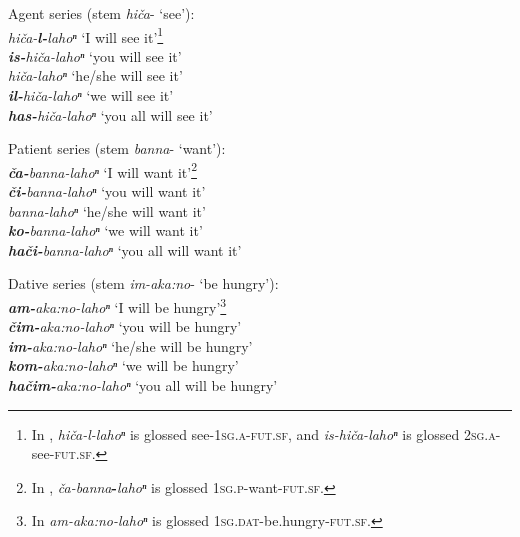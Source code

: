 \documentclass[output=paper,colorlinks,citecolor=brown]{langscibook}
\begin{document}
\ea\label{ex:koa:2} Agent series (stem \textit{hiča}- ‘see’): \\ 
        \textit{hiča-\textbf{l-}lahoⁿ} \tab ‘I will see it’\footnote{In , \textit{hiča-l-lahoⁿ} is glossed see-1\textsc{sg}.\textsc{a}{}-\textsc{fut}.\textsc{sf}, and \textit{is-hiča-lahoⁿ} is glossed 2\textsc{sg}.\textsc{a}-see-\textsc{fut}.\textsc{sf}.}  \\
        \textit{\textbf{is-}hiča-lahoⁿ} \tab ‘you will see it’ \\
        \textit{hiča-lahoⁿ} \tab ‘he/she will see it’ \\
        \textit{\textbf{il-}hiča-lahoⁿ} \tab ‘we will see it’ \\
        \textit{\textbf{has-}hiča-lahoⁿ} \tab ‘you all will see it’ \\
\z  

\ea\label{ex:koa:3} Patient series (stem \textit{banna}- ‘want’): \\
    \textit{\textbf{ča-}banna-lahoⁿ} \tab ‘I will want it’\footnote{In , \textit{ča-banna}\textbf{{}-}\textit{lahoⁿ} is glossed 1\textsc{sg.p}{}-want-\textsc{fut}.\textsc{sf}.} \\
    \textit{\textbf{či-}banna-lahoⁿ} \tab ‘you will want it’ \\
    \textit{banna-lahoⁿ} \tab ‘he/she will want it’ \\
    \textit{\textbf{ko-}banna-lahoⁿ} \tab ‘we will want it’ \\
    \textit{\textbf{hači-}banna-lahoⁿ} \tab ‘you all will want it’ \\
\z 

\ea\label{ex:koa:4} Dative series (stem \textit{im-aka:no}- ‘be hungry’):\\ 
    \textit{\textbf{am-}aka:no-lahoⁿ} \tab ‘I will be hungry’\footnote{In  \textit{am-aka:no-lahoⁿ} is glossed 1\textsc{sg}.\textsc{dat}{}-be.hungry-\textsc{fut}.\textsc{sf}.} \\
    \textit{\textbf{čim-}aka:no-lahoⁿ} \tab ‘you will be hungry’ \\
    \textit{\textbf{im-}aka:no-lahoⁿ} \tab ‘he/she will be hungry’ \\
    \textit{\textbf{kom-}aka:no-lahoⁿ} \tab ‘we will be hungry’ \\
    \textit{\textbf{hačim-}aka:no-lahoⁿ} \tab ‘you all will be hungry’ \\
\z 
\end{document}
